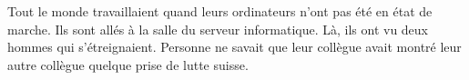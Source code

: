 \documentclass[letterpaper]{article}
\begin{document}
\doublespacing
Tout le monde travaillaient quand leurs ordinateurs n'ont pas été en état de marche. Ils sont allés à la salle du serveur informatique. Là, ils ont vu deux hommes qui s'étreignaient. Personne ne savait que leur collègue avait montré leur autre collègue quelque prise de lutte suisse.
\end{document}
